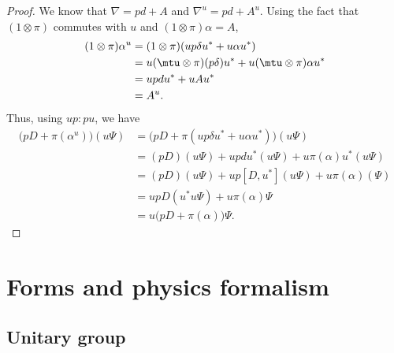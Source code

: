 \begin{proof}
	We know that $\nabla=pd+A$ and $\nabla^u=pd+A^u$. Using the fact that $(1\otimes\pi)$ commutes with $u$ and $(1\otimes\pi)\alpha=A$,
	\[
		\begin{split}
			(1\otimes\pi)\alpha^u&=(1\otimes\pi)(up\delta u^*+u\alpha u^*)\\
			&=u(\mtu\otimes\pi)(p\delta)u^*+u(\mtu\otimes\pi)\alpha u^*\\
			&=updu^*+uAu^*\\
			&=A^u.
		\end{split}
	\]
	Thus, using $up:pu$,  we have
	\begin{align}
		\big( pD+\pi(\alpha^u) \big)(u\Psi) & =\big( pD+\pi(up\delta u^*+u\alpha u^*) \big)(u\Psi) \\
		                                    & =(pD)(u\Psi)+updu^*(u\Psi)+u\pi(\alpha)u^*(u\Psi)    \\
		                                    & =(pD)(u\Psi)+up[D,u^*](u\Psi)+u\pi(\alpha)(\Psi)     \\
		                                    & =upD(u^*u\Psi)+u\pi(\alpha)\Psi                      \\
		                                    & =u\big( pD+\pi(\alpha) \big)\Psi.
	\end{align}

\end{proof}




%
\section{Forms and physics formalism}
%

\subsection{Unitary group}

